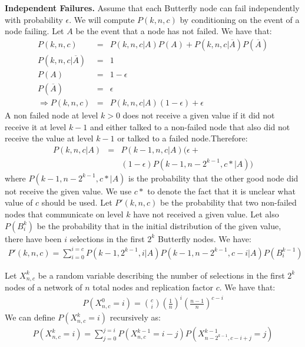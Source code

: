 \documentclass[11pt,twocolumn]{MyTightStyle}
\theoremstyle{plain}
\theoremstyle{definition}
\theoremstyle{remark}
\numberwithin{equation}{section}
\begin{document}
  {\bf Independent Failures.}
  Assume that each Butterfly node can fail independently with
  probability $\epsilon$. We will compute $P(k,n,c)$ by conditioning
  on the event of a node failing. Let $A$ be the event that a node has
  not failed. We have that:
  \begin{eqnarray*}
    P(k,n,c) &=& P(k,n,c|A)P(A) +
    P(k,n,c|\overline{A})P(\overline{A})\\
    P(k,n,c|\overline{A}) &=& 1\\
    P(A) &=& 1-\epsilon\\
    P(\overline{A})&=& \epsilon      \\
    \Rightarrow P(k,n,c) &=& P(k,n,c|A)(1-\epsilon) + \epsilon
  \end{eqnarray*}
  A non failed node at level $k > 0$ does not receive a given value if
  it did not receive it at level $k-1$ and either talked to a
  non-failed node that also did not receive the value at level
  $k-1$ or talked to a failed node.Therefore:
  \begin{eqnarray*}
    P(k,n,c|A) &=& P(k-1,n,c|A)(\epsilon +\\
    &&(1-\epsilon)P(k-1,n-2^{k-1},c*|A))
  \end{eqnarray*}
  where $P(k-1,n-2^{k-1},c*|A)$ is the probability that the other good
  node did not receive the given value. We use $c*$ to denote the fact
  that it is unclear what value of $c$ should be used. Let $P'(k, n,
  c)$ be the probability that two non-failed nodes that communicate on level
  $k$ have not received a given value. Let also $P(B_i^k)$ be the
  probability that in the initial distribution of the given value,
  there have been $i$ selections in the first $2^k$ Butterfly
  nodes. We have:
  \begin{eqnarray*}
    P'(k, n, c) = \sum_{i=0}^{i=c}P(k-1,2^{k-1},i|A)P(k-1, n-2^{k-1}, c-i|A)P(B_i^{k-1})
  \end{eqnarray*}

  Let $X_{n,c}^k$ be a random variable describing the number of
  selections in the first $2^k$ nodes of a network of $n$ total nodes
  and replication factor $c$. We have that:
  \begin{eqnarray*}
    P(X_{n,c}^0=i) = {c \choose i}(\frac{1}{n})^i(\frac{n-1}{n})^{c-i} 
  \end{eqnarray*}
  We can define $P(X_{n,c}^k=i)$ recursively as:
  \begin{eqnarray*}
    P(X_{n,c}^k=i) = \sum_{j=0}^{j=i}P(X_{n,c}^{k-1}=
    i-j)P(X_{n-2^{k-1},c-i+j}^{k-1}= j)
  \end{eqnarray*}
\end{document}
